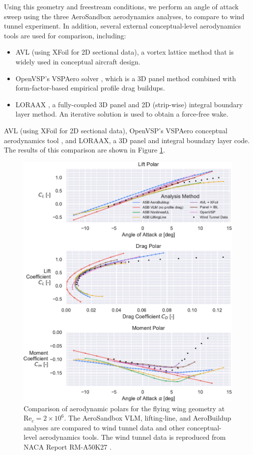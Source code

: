 Using this geometry and freestream conditions, we perform an angle of attack sweep using the three AeroSandbox aerodynamics analyses, to compare to wind tunnel experiment. In addition, several external conceptual-level aerodynamics tools are used for comparison, including:
\begin{itemize}[noitemsep]
    \item AVL \cite{avl} (using XFoil \cite{drela_xfoil_1989} for 2D sectional data), a vortex lattice method that is widely used in conceptual aircraft design.
    \item OpenVSP's VSPAero solver \cite{mcdonald_open_2022}, which is a 3D panel method combined with form-factor-based empirical profile drag buildups.
    \item LORAAX \cite{loraax}, a fully-coupled 3D panel and 2D (strip-wise) integral boundary layer method. An iterative solution is used to obtain a force-free wake.
\end{itemize}

AVL \cite{avl} (using XFoil \cite{drela_xfoil_1989} for 2D sectional data), OpenVSP's VSPAero conceptual aerodynamics tool \cite{mcdonald_open_2022}, and LORAAX, a 3D panel and integral boundary layer code. The results of this comparison are shown in Figure \ref{fig:fw_results}.

\begin{figure}[!htb]
    \centering
    \includegraphics[width=\textwidth]{../figures/aero_validation/flying_wing_polars-crop.pdf}
    \caption{Comparison of aerodynamic polars for the flying wing geometry at $\text{Re}_c=2 \times 10^6$. The AeroSandbox VLM, lifting-line, and AeroBuildup analyses are compared to wind tunnel data and other conceptual-level aerodynamics tools. The wind tunnel data is reproduced from NACA Report RM-A50K27 \cite{tinling_effects_1951}.}
    \label{fig:fw_results}
\end{figure}

